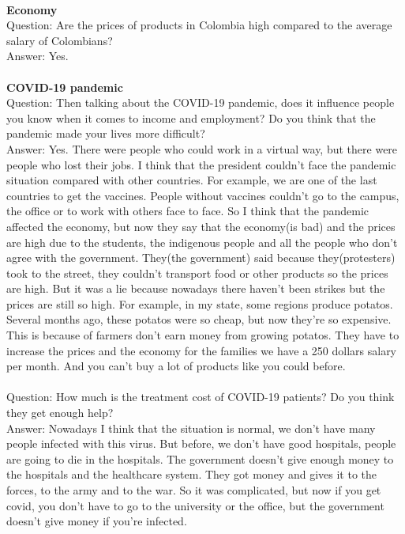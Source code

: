 \documentclass{phyasgn}\usepackage{nag}
\begin{document}
\\
\textbf{Economy}\\
Question: Are the prices of products in Colombia high compared to the average salary of Colombians?\\
Answer: Yes. \\
\\
\textbf{COVID-19 pandemic}\\
Question: Then talking about the COVID-19 pandemic, does it influence people you know when it comes to income and employment? Do you think that the pandemic made your lives more difficult?\\
Answer: Yes. There were people who could work in a virtual way, but there were people who lost their jobs. I think that the president couldn’t face the pandemic situation compared with other countries. For example, we are one of the last countries to get the vaccines. People without vaccines couldn’t go to the campus, the office or to work with others face to face. So I think that the pandemic affected the economy, but now they say that the economy(is bad) and the prices are high due to the students, the indigenous people and all the people who don’t agree with the government. They(the government) said because they(protesters) took to the street, they couldn’t transport food or other products so the prices are high. But it was a lie because nowadays there haven’t been strikes but the prices are still so high. For example, in my state, some regions produce potatos. Several months ago, these potatos were so cheap, but now they’re so expensive. This is because of farmers don’t earn money from growing potatos. They have to increase the prices and the economy for the families we have a 250 dollars salary per month. And you can’t buy a lot of products like you could before. \\
\\
Question: How much is the treatment cost of COVID-19 patients? Do you think they get enough help?\\
Answer: Nowadays I think that the situation is normal, we don’t have many people infected with this virus. But before, we don’t have good hospitals, people are going to die in the hospitals. The government doesn’t give enough money to the hospitals and the healthcare system. They got money and gives it to the forces, to the army and to the war. So it was complicated, but now if you get covid, you don’t have to go to the university or the office, but the government doesn’t give money if you’re infected.\\
\end{document}
